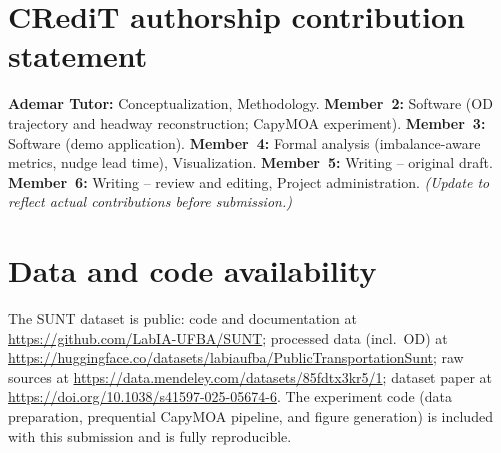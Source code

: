 \documentclass[final,5p,times,twocolumn,authoryear]{elsarticle}
\begin{document}
\section*{CRediT authorship contribution statement}
\textbf{Ademar Tutor:} Conceptualization, Methodology.
\textbf{Member~2:} Software (OD trajectory and headway reconstruction; CapyMOA experiment).
\textbf{Member~3:} Software (demo application).
\textbf{Member~4:} Formal analysis (imbalance-aware metrics, nudge lead time), Visualization.
\textbf{Member~5:} Writing -- original draft.
\textbf{Member~6:} Writing -- review and editing, Project administration.
\emph{(Update to reflect actual contributions before submission.)}

\section*{Data and code availability}
The SUNT dataset is public: code and documentation at
\url{https://github.com/LabIA-UFBA/SUNT}; processed data (incl.\ OD) at
\url{https://huggingface.co/datasets/labiaufba/PublicTransportationSunt}; raw sources at
\url{https://data.mendeley.com/datasets/85fdtx3kr5/1}; dataset paper at
\url{https://doi.org/10.1038/s41597-025-05674-6}. The experiment code (data preparation,
prequential CapyMOA pipeline, and figure generation) is included with this submission and is
fully reproducible.



\end{document}
